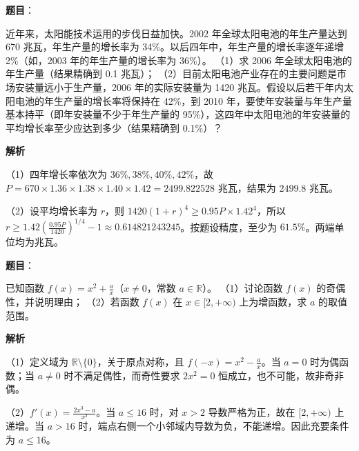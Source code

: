 \begin{answer}

\textbf{题目}：

近年来，太阳能技术运用的步伐日益加快。2002 年全球太阳电池的年生产量达到 670 兆瓦，年生产量的增长率为 34\%。以后四年中，年生产量的增长率逐年递增 2\%（如，2003 年的年生产量的增长率为 36\%）。
（1）求 2006 年全球太阳电池的年生产量（结果精确到 0.1 兆瓦）；
（2）目前太阳电池产业存在的主要问题是市场安装量远小于生产量，2006 年的实际安装量为 1420 兆瓦。假设以后若干年内太阳电池的年生产量的增长率将保持在 42\%，到 2010 年，要使年安装量与年生产量基本持平（即年安装量不少于年生产量的 95\%），这四年中太阳电池的年安装量的平均增长率至少应达到多少（结果精确到 0.1\%）？

\textbf{解析}

（1）四年增长率依次为 $36\%,38\%,40\%,42\%$，故 $P=670\times1.36\times1.38\times1.40\times1.42=2499.822528$ 兆瓦，结果为 $2499.8$ 兆瓦。

（2）设平均增长率为 $r$，则 $1420(1+r)^4\ge0.95P\times1.42^4$，所以 $r\ge1.42(\frac{0.95P}{1420})^{1/4}-1\approx0.614821243245$。按题设精度，至少为 $61.5\%$。两端单位均为兆瓦。


\end{answer}
\begin{answer}

\textbf{题目}：

已知函数 $f(x)=x^2+\frac ax$（$x\ne0$，常数 $a\in\mathbb R$）。
（1）讨论函数 $f(x)$ 的奇偶性，并说明理由；
（2）若函数 $f(x)$ 在 $x\in[2,+\infty)$ 上为增函数，求 $a$ 的取值范围。

\textbf{解析}

（1）定义域为 $\mathbb R\setminus\{0\}$，关于原点对称，且 $f(-x)=x^2-\frac ax$。当 $a=0$ 时为偶函数；当 $a\ne0$ 时不满足偶性，而奇性要求 $2x^2=0$ 恒成立，也不可能，故非奇非偶。

（2）$f'(x)=\frac{2x^3-a}{x^2}$。当 $a\le16$ 时，对 $x>2$ 导数严格为正，故在 $[2,+\infty)$ 上递增。当 $a>16$ 时，端点右侧一个小邻域内导数为负，不能递增。因此充要条件为 $a\le16$。


\end{answer}
